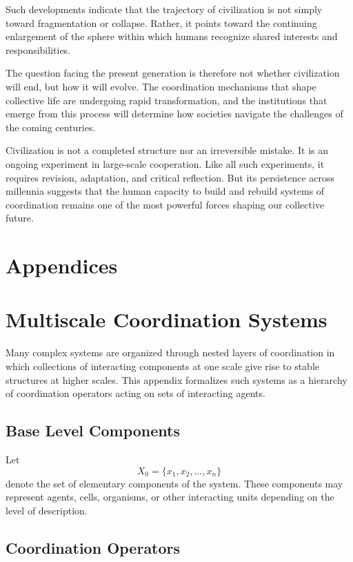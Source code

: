 \documentclass[12pt]{article}
\begin{document}
Such developments indicate that the trajectory of civilization is not simply toward fragmentation or collapse. Rather, it points toward the continuing enlargement of the sphere within which humans recognize shared interests and responsibilities.

The question facing the present generation is therefore not whether civilization will end, but how it will evolve. The coordination mechanisms that shape collective life are undergoing rapid transformation, and the institutions that emerge from this process will determine how societies navigate the challenges of the coming centuries.

Civilization is not a completed structure nor an irreversible mistake. It is an ongoing experiment in large-scale cooperation. Like all such experiments, it requires revision, adaptation, and critical reflection. But its persistence across millennia suggests that the human capacity to build and rebuild systems of coordination remains one of the most powerful forces shaping our collective future.

\newpage
\section*{Appendices}

\appendix

\section{Multiscale Coordination Systems}

Many complex systems are organized through nested layers of coordination in which collections of interacting components at one scale give rise to stable structures at higher scales. This appendix formalizes such systems as a hierarchy of coordination operators acting on sets of interacting agents.

\subsection{Base Level Components}

Let
\[
X_0 = \{x_1, x_2, \dots , x_n\}
\]
denote the set of elementary components of the system. These components may represent agents, cells, organisms, or other interacting units depending on the level of description.

\subsection{Coordination Operators}
\end{document}
